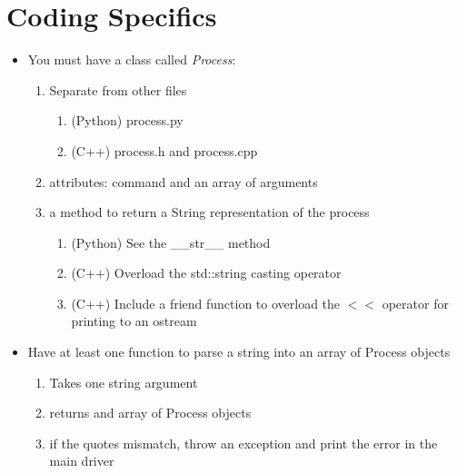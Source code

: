 \documentclass[12pt]{article}
\begin{document}
\section*{Coding Specifics}
\begin{itemize}
\item You must have a class called {\em Process}:
	\begin{enumerate}
	\item Separate from other files
		\begin{enumerate}
		\item (Python) process.py
		\item (C++) process.h and process.cpp
		\end{enumerate}
	\item attributes: command and an array of arguments
	\item a method to return a String representation of the process
		\begin{enumerate}
		\item (Python) See the \_\_str\_\_ method
		\item (C++) Overload the std::string casting operator
		\item (C++) Include a friend function to overload the $<<$ operator for printing to an ostream
		\end{enumerate}
	\end{enumerate}
\item Have at least one function to parse a string into an array of Process objects
	\begin{enumerate}
	\item Takes one string argument
	\item returns and array of Process objects
	\item if the quotes mismatch, throw an exception and print the error in the main driver
	\end{enumerate}
\end{itemize}
\end{document}
